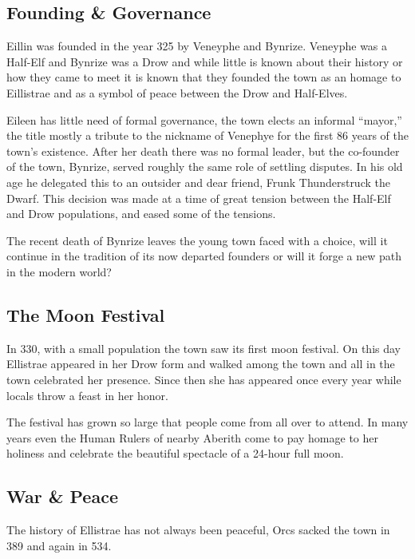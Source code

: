 \documentclass[smalldemyvopaper,11pt,twoside,onecolumn,openright,extrafontsizes]{memoir}
\begin{document}
\hypertarget{founding-governance}{%
\subsection{Founding \& Governance}\label{founding-governance}}

Eillin was founded in the year 325 by Veneyphe and Bynrize. Veneyphe was
a Half-Elf and Bynrize was a Drow and while little is known about their
history or how they came to meet it is known that they founded the town
as an homage to Eillistrae and as a symbol of peace between the Drow and
Half-Elves.

Eileen has little need of formal governance, the town elects an informal
``mayor,'' the title mostly a tribute to the nickname of Venephye for
the first 86 years of the town's existence. After her death there was no
formal leader, but the co-founder of the town, Bynrize, served roughly
the same role of settling disputes. In his old age he delegated this to
an outsider and dear friend, Frunk Thunderstruck the Dwarf. This
decision was made at a time of great tension between the Half-Elf and
Drow populations, and eased some of the tensions.

The recent death of Bynrize leaves the young town faced with a choice,
will it continue in the tradition of its now departed founders or will
it forge a new path in the modern world?

\hypertarget{the-moon-festival}{%
\subsection{The Moon Festival}\label{the-moon-festival}}

In 330, with a small population the town saw its first moon festival. On
this day Ellistrae appeared in her Drow form and walked among the town
and all in the town celebrated her presence. Since then she has appeared
once every year while locals throw a feast in her honor.

The festival has grown so large that people come from all over to
attend. In many years even the Human Rulers of nearby Aberith come to
pay homage to her holiness and celebrate the beautiful spectacle of a
24-hour full moon.

\hypertarget{war-peace}{%
\subsection{War \& Peace}\label{war-peace}}

The history of Ellistrae has not always been peaceful, Orcs sacked the
town in 389 and again in 534.
\end{document}
